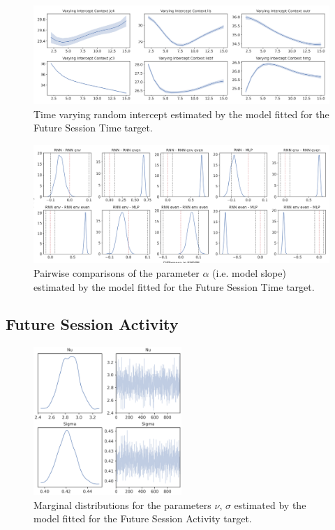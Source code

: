 \begin{figure}[H]
\centering
\includegraphics[width=\textwidth]{images/appendix_C/Future Session Time_interc_3.png}
\caption[\textbf{Future session time time-varying random intercept}]{Time varying random intercept estimated by the model fitted for the Future Session Time target.}
\label{interc_sess_3}
\end{figure}

\begin{figure}[H]
\centering
\includegraphics[width=\textwidth]{images/appendix_C/Future_Session_Time_comp_3.png}
\caption[\textbf{Future session time pairwise comparisons of model fixed effect}]{Pairwise comparisons of the parameter $\alpha$ (i.e. model slope) estimated by the model fitted for the Future Session Time target.}
\label{comp_sess_3}
\end{figure}

\subsection{Future Session Activity}
\label{future_acti_bayes_3}

\begin{figure}[H]
\centering
\includegraphics[width=0.5\textwidth]{images/appendix_C/Future Session Activity_marginals_3.png}
\caption[\textbf{Future session activity marginal distributions}]{Marginal distributions for the parameters $\nu$, $\sigma$ estimated by the model fitted for the Future Session Activity target.}
\label{marginals_acti_3}
\end{figure}

